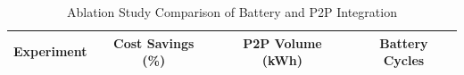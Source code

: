 \begin{table}[h]
\centering
\caption{Ablation Study Comparison of Battery and P2P Integration}
\label{table:ablation_results}
\begin{tabular}{lccc}
\hline
Experiment & Cost Savings (\%) & P2P Volume (kWh) & Battery Cycles \\
\hline
\hline
\end{tabular}
\end{table}

